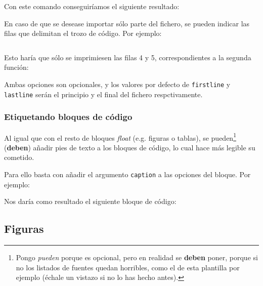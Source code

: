 \documentclass[%
    school=etsisi,%
    type=pfg,%
    degree=61CI,%
]{upm-report}
\begin{document}
Con este comando conseguiríamos el siguiente resultado:



En caso de que se desease importar sólo parte del fichero, se pueden indicar las filas que delimitan el trozo de código. Por ejemplo:

\begin{lstlisting}[language=TeX]

\end{lstlisting}

Esto haría que sólo se imprimiesen las filas 4 y 5, correspondientes a la segunda función:



Ambas opciones son opcionales, y los valores por defecto de \texttt{firstline} y \texttt{lastline} serán el principio y el final del fichero respctivamente.

\subsubsection{Etiquetando bloques de código}

Al igual que con el resto de bloques \textit{float} (e.g. figuras o tablas), se pueden\footnote{Pongo \textit{pueden} porque es opcional, pero en realidad se \textbf{deben} poner, porque si no los listados de fuentes quedan horribles, como el de esta plantilla por ejemplo (échale un vistazo si no lo has hecho antes).} (\textbf{deben}) añadir pies de texto a los bloques de código, lo cual hace más legible su cometido.

Para ello basta con añadir el argumento \texttt{caption} a las opciones del bloque. Por ejemplo:



Nos daría como resultado el siguiente bloque de código:
 


\subsection{Figuras}
\label{ch:figuras}
\end{document}
